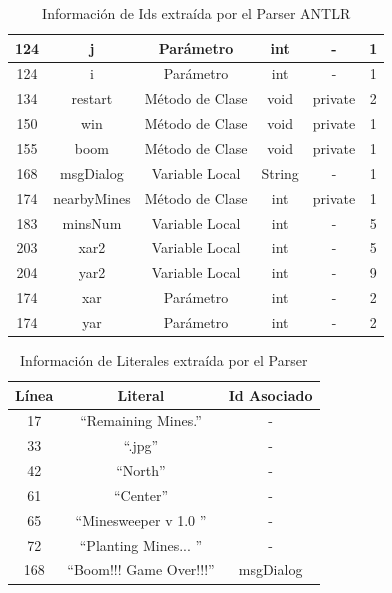 \documentclass[a4paper,12pt]{report}
\begin{document}
\begin{table}[h]
\begin{tabular}{| c | c | c | c | c | c | }
124&j&Parámetro&int&-&1 \\ \hline
124&i&Parámetro&int&-&1 \\ \hline
134&restart&Método de Clase&void&private&2 \\ \hline
150&win&Método de Clase&void&private&1 \\ \hline
155&boom&Método de Clase&void&private&1 \\ \hline
168&msgDialog&Variable Local&String&-&1 \\ \hline
174&nearbyMines&Método de Clase&int&private&1 \\ \hline
183&minsNum&Variable Local&int&-&5 \\ \hline
203&xar2&Variable Local&int&-&5 \\ \hline
204&yar2&Variable Local&int&-&9 \\ \hline
174&xar&Parámetro&int&-&2 \\ \hline
174&yar&Parámetro&int&-&2 \\ \hline     
   	\end{tabular}  
	 
   \caption{Información de Ids extraída por el Parser ANTLR}
   \label{tabla2}
     
\end{table} 




\begin{center}
	\begin{table}[t]
	
		\centering
   		\begin{tabular}{| c | c | c |}      
       \hline
  	   \textsf{Línea} & \textsf{Literal} & \textsf{Id Asociado} \\ \hline
17&“Remaining Mines.”&- \\ \hline
33&“.jpg”&- \\ \hline
42&“North”&- \\ \hline
61&“Center”&- \\ \hline
65&“Minesweeper v 1.0 ”&- \\ \hline
72&“Planting Mines... ”&- \\ \hline
168&“Boom!!! Game Over!!!”&msgDialog \\ \hline

  \end{tabular} 
	 
   \caption{Información de Literales extraída por el Parser}
   \label{tabla3}
     
  \end{table} 
\end{center}
\end{document}
